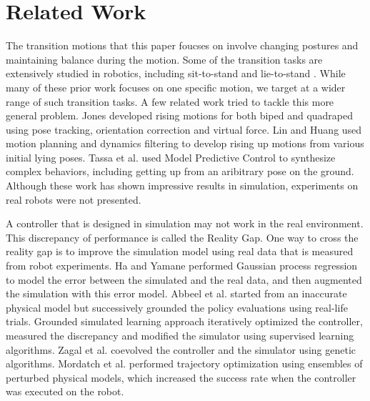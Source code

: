 \section{Related Work}

The transition motions that this paper foucses on involve changing postures and maintaining balance during the motion. Some of the transition tasks are extensively studied in robotics, including sit-to-stand \cite{Faloutsos:2003,Iida:2004,Pchelkin:2010,Mistry:2010} and lie-to-stand \cite{morimoto:1998,Faloutsos:2001,Hirukawa:2005,Kanehiro:2007}. While many of these prior work focuses on one specific motion, we target at a wider range of such transition tasks. A few related work tried to tackle this more general problem. Jones \cite{jones:2011} developed rising motions for both biped and quadraped using pose tracking, orientation correction and virtual force. Lin and Huang \cite{lin:2012} used motion planning and dynamics filtering to develop rising up motions from various initial lying poses. Tassa et al. \cite{tassa:2012} used Model Predictive Control to synthesize complex behaviors, including getting up from an aribitrary pose on the ground. Although these work has shown impressive results in simulation, experiments on real robots were not presented.

A controller that is designed in simulation may not work in the real environment. This discrepancy of performance is called the Reality Gap. One way to cross the reality gap is to improve the simulation model using real data that is measured from robot experiments. Ha and Yamane \cite{HA:2015} performed Gaussian process regression to model the error between the simulated and the real data, and then augmented the simulation with this error model. Abbeel et al. \cite{Abbeel:2006} started from an inaccurate physical model but successively grounded the policy evaluations using real-life trials. Grounded simulated learning approach \cite{Farchy:2013} iteratively optimized the controller, measured the discrepancy and modified the simulator using supervised learning algorithms. Zagal et al. \cite{zagal2004} coevolved the controller and the simulator using genetic algorithms. Mordatch et al. \cite{Mordatch:2015} performed trajectory optimization using ensembles of perturbed physical models, which increased the success rate when the controller was executed on the robot.

